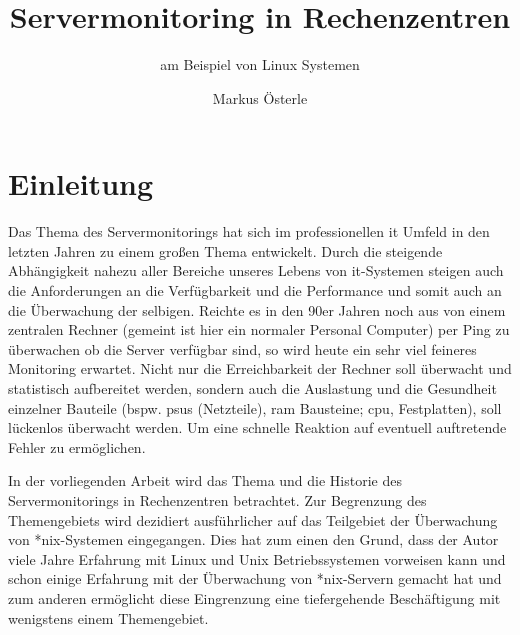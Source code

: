 \documentclass[12pt,a4paper,parskip,listof=totoc,bibliography=totoc]{scrreprt}
\begin{document}
	\subject{Seminararbeit im Studiengang \glqq Verwaltungsinformatik\grqq}
	\author{Markus Österle}
	\title{Servermonitoring in Rechenzentren}
	\subtitle{am Beispiel von Linux Systemen}
	\publishers{Betreut von Dipl. Inf. Stefan Müller}
	\date{} %

	\maketitle
	
	\tableofcontents
	\onehalfspacing
	\chapter{Einleitung}
	Das Thema des Servermonitorings hat sich im professionellen \acrshort{it} Umfeld in den letzten Jahren zu einem großen Thema entwickelt. Durch die steigende Abhängigkeit nahezu aller Bereiche unseres Lebens von \acrshort{it}-Systemen steigen auch die Anforderungen an die Verfügbarkeit und die Performance und somit auch an die Überwachung der selbigen. Reichte es in den 90er Jahren noch aus von einem zentralen Rechner (gemeint ist hier ein normaler Personal Computer) per Ping zu überwachen ob die Server verfügbar sind, so wird heute ein sehr viel feineres Monitoring erwartet. Nicht nur die Erreichbarkeit der Rechner soll überwacht und statistisch aufbereitet werden, sondern auch die Auslastung und die Gesundheit einzelner Bauteile (bspw. \acrlong{psu}s (Netzteile), \acrshort{ram} Bausteine; \acrshort{cpu}, Festplatten), soll lückenlos überwacht werden. Um eine schnelle Reaktion auf eventuell auftretende Fehler zu ermöglichen. 

	In der vorliegenden Arbeit wird das Thema und die Historie des Servermonitorings in Rechenzentren betrachtet. Zur Begrenzung des Themengebiets wird dezidiert ausführlicher auf das Teilgebiet der Überwachung von *nix-Systemen eingegangen. Dies hat zum einen den Grund, dass der Autor viele Jahre Erfahrung mit Linux und Unix Betriebssystemen vorweisen kann und schon einige Erfahrung mit der Überwachung von *nix-Servern gemacht hat und zum anderen ermöglicht diese Eingrenzung eine tiefergehende Beschäftigung mit wenigstens einem Themengebiet.
\end{document}
